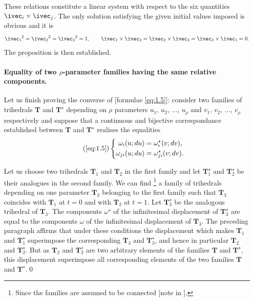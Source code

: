 These relations constitute a linear system with respect to the six quantities $\ivec_{i}\times\ivec_{j}$. The only solution satisfying the given initial values imposed is obvious and it is
\[
{\ivec_{1}}^{2}=
{\ivec_{2}}^{2}=
{\ivec_{3}}^{2}=1,\qquad
\ivec_{1}\times\ivec_{2}=
\ivec_{2}\times\ivec_{3}=
\ivec_{3}\times\ivec_{1}=0.
\]
The proposition is then established.

\paragraph{Equality of two $\rho$-parameter families having the same relative components.}
\label{sec:6}
Let us finish proving the converse of  [formulae \eqref{eq:1.5}]: consider two families of trihedrals $\mathbf{T}$ and $\mathbf{T}^{\star}$ depending on $\rho$ parameters $u_{1}$, $u_{2}$, $\dots$, $u_{\rho}$ and $v_{1}$, $v_{2}$, $\dots$, $v_{\rho}$ respectively and suppose that a continuous and bijective correspondance established between $\mathbf{T}$ and $\mathbf{T}^{\star}$ realises the equalities
\begin{equation}
  \label{eq:1.5a}\tag{\ref{eq:1.5}}
  \left\{
    \begin{aligned}
      \omega_{i}(u;du)&=\omega^{\star}_{i}(v;dv),\\
      \omega_{ji}(u;du)&=\omega^{\star}_{ji}(v;dv).
    \end{aligned}
  \right.
\end{equation}

Let us choose two trihedrals $\mathbf{T}_{1}$ and $\mathbf{T}_{2}$ in the first family and let $\mathbf{T}_{1}^{\star}$ and $\mathbf{T}_{2}^{\star}$ be their analogues in the second family. We can find \footnote{Since the families are assumed to be connected [note in ].} a family of trihedrals depending on one parameter $\mathbf{T}_{3}$ belonging to the first family such that $\mathbf{T}_{3}$ coincides with $\mathbf{T}_{1}$ at $t=0$ and with $\mathbf{T}_{2}$ at $t=1$. Let $\mathbf{T}_{3}^{\star}$ be the analogous trihedral of $\mathbf{T}_{3}$. The components $\omega^{\star}$ of the infinitesimal displacement of $\mathbf{T}_{3}^{\star}$ are equal to the components $\omega$ of the infinitesimal displacement of $\mathbf{T}_{3}$. The preceding paragraph affirms that under these conditions the displacement which makes $\mathbf{T}_{1}$ and $\mathbf{T}_{1}^{\star}$ superimpose the corresponding $\mathbf{T}_{3}$ and $\mathbf{T}_{3}^{\star}$, and hence in particular $\mathbf{T}_{2}$ and $\mathbf{T}_{2}^{\star}$. But as $\mathbf{T}_{2}$ and $\mathbf{T}_{2}^{\star}$ are two arbitrary elements of the families $\mathbf{T}$ and $\mathbf{T}^{\star}$, this displacement superimpose all corresponding elements of the two families $\mathbf{T}$ and $\mathbf{T}^{\star}$.\qed

